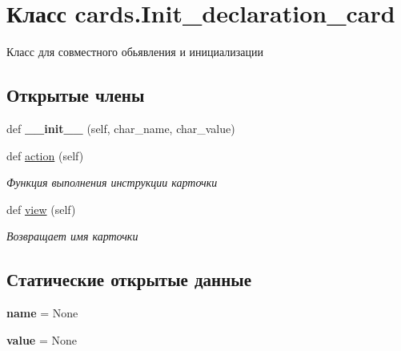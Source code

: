 \hypertarget{classcards_1_1_init__declaration__card}{}\section{Класс cards.\+Init\+\_\+declaration\+\_\+card}
\label{classcards_1_1_init__declaration__card}


Класс для совместного обьявления и инициализации  


\subsection*{Открытые члены}
\begin{DoxyCompactItemize}
\item 
\mbox{\label{classcards_1_1_init__declaration__card_acff3ee06431379a3d3c0c67ebafe88b8}} 
def {\bfseries \+\_\+\+\_\+init\+\_\+\+\_\+} (self, char\+\_\+name, char\+\_\+value)
\item 
def \mbox{\hyperlink{classcards_1_1_init__declaration__card_ac2bf0e8cdc091e7634e965c68772727c}{action}} (self)
\begin{DoxyCompactList}\small\item\em Функция выполнения инструкции карточки \end{DoxyCompactList}\item 
def \mbox{\hyperlink{classcards_1_1_init__declaration__card_a5bc4b4fe857cd05102f6f0c287d6a8b8}{view}} (self)
\begin{DoxyCompactList}\small\item\em Возвращает имя карточки \end{DoxyCompactList}\end{DoxyCompactItemize}
\subsection*{Статические открытые данные}
\begin{DoxyCompactItemize}
\item 
\mbox{\label{classcards_1_1_init__declaration__card_a127b20d1006ae27a252b46eeac5c55ef}} 
{\bfseries name} = None
\item 
\mbox{\label{classcards_1_1_init__declaration__card_ad7d7c09784c3d95a1424627c7652402b}} 
{\bfseries value} = None
\end{DoxyCompactItemize}


